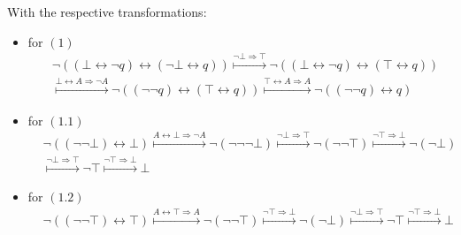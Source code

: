 \documentclass[11pt,a4paper]{article}
\begin{document}
With the respective transformations:
\begin{itemize} 
\item for $(1)$
\begin{equation*}
\begin{split}
&\neg( (\bot \leftrightarrow \neg q) \leftrightarrow (\neg \bot \leftrightarrow q)) \stackrel{\neg \bot \Rightarrow\top}{\longmapsto} 
\neg( (\bot \leftrightarrow \neg q) \leftrightarrow (\top \leftrightarrow q)) \\ 
&\stackrel{\bot \leftrightarrow A  \Rightarrow \neg A}{\longmapsto}
\neg( (\neg \neg q) \leftrightarrow (\top \leftrightarrow q)) \stackrel{\top \leftrightarrow A  \Rightarrow  A}{\longmapsto} \neg( (\neg \neg q) \leftrightarrow q)
\end{split}
\end{equation*}

\item for $(1.1)$
\begin{equation*}
\begin{split}
& \neg( (\neg \neg \bot) \leftrightarrow \bot) \stackrel{A \leftrightarrow \bot  \Rightarrow \neg A}{\longmapsto} \neg ( \neg \neg \neg \bot) \stackrel{\neg \bot \Rightarrow \top}{\longmapsto}
\neg ( \neg \neg \top) \stackrel{\neg \top \Rightarrow \bot}{\longmapsto} \neg ( \neg \bot) \\
&\stackrel{\neg \bot \Rightarrow \top}{\longmapsto} \neg \top \stackrel{\neg \top \Rightarrow \bot}{\longmapsto}
 \bot
\end{split}
\end{equation*}

\item for $(1.2)$
\begin{equation*}
\begin{split}
& \neg( (\neg \neg \top) \leftrightarrow \top) \stackrel{A \leftrightarrow \top  \Rightarrow A}{\longmapsto}
 \neg(\neg \neg \top) \stackrel{\neg \top \Rightarrow \bot}{\longmapsto}  \neg(\neg \bot) \stackrel{\neg \bot \Rightarrow \top}{\longmapsto}  \neg\top \stackrel{\neg \top \Rightarrow \bot}{\longmapsto}  \bot 
\end{split}
\end{equation*}


\end{itemize}
\end{document}
